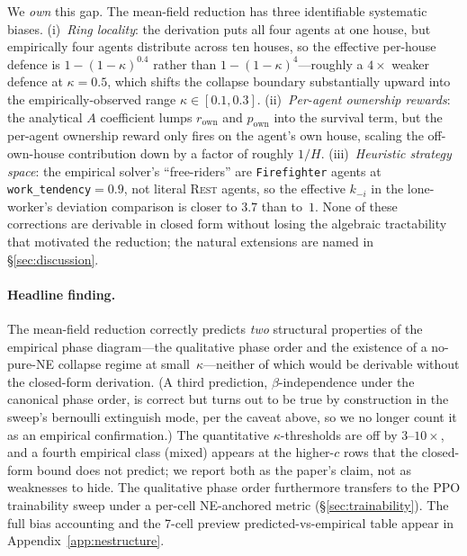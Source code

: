 \documentclass{anvil-paper}
\begin{document}
We \emph{own} this gap. The mean-field reduction has three identifiable
systematic biases. (i)~\emph{Ring locality}: the derivation puts all four
agents at one house, but empirically four agents distribute across ten
houses, so the effective per-house defence is $1{-}(1{-}\kappa)^{0.4}$ rather
than $1{-}(1{-}\kappa)^4$---roughly a $4\times$ weaker defence at $\kappa{=}0.5$,
which shifts the collapse boundary substantially upward into the
empirically-observed range $\kappa\in[0.1,0.3]$. (ii)~\emph{Per-agent
ownership rewards}: the analytical $A$ coefficient lumps $r_{\text{own}}$
and $p_{\text{own}}$ into the survival term, but the per-agent ownership
reward only fires on the agent's own house, scaling the off-own-house
contribution down by a factor of roughly $1/H$. (iii)~\emph{Heuristic
strategy space}: the empirical solver's ``free-riders'' are
\texttt{Firefighter} agents at \texttt{work\_tendency}${=}0.9$, not literal
\textsc{Rest} agents, so the effective $k_{-i}$ in the lone-worker's
deviation comparison is closer to $3.7$ than to~$1$. None of these
corrections are derivable in closed form without losing the algebraic
tractability that motivated the reduction; the natural extensions are
named in \S\ref{sec:discussion}.

\paragraph{Headline finding.}
The mean-field reduction correctly predicts \emph{two} structural
properties of the empirical phase diagram---the qualitative phase order
and the existence of a no-pure-NE collapse regime at
small~$\kappa$---neither of which would be derivable without the
closed-form derivation. (A third prediction, $\beta$-independence under
the canonical phase order, is correct but turns out to be true by
construction in the sweep's bernoulli extinguish mode, per the caveat
above, so we no longer count it as an empirical confirmation.) The quantitative
$\kappa$-thresholds are off by $3$--$10\times$, and a fourth empirical class
(\textsf{mixed}) appears at the higher-$c$ rows that the closed-form bound
does not predict; we report both as the paper's claim, not as weaknesses to
hide. The qualitative phase order furthermore transfers to the PPO
trainability sweep under a per-cell NE-anchored metric
(\S\ref{sec:trainability}). The full bias accounting and the 7-cell
preview predicted-vs-empirical table appear in Appendix~\ref{app:nestructure}.
\end{document}
